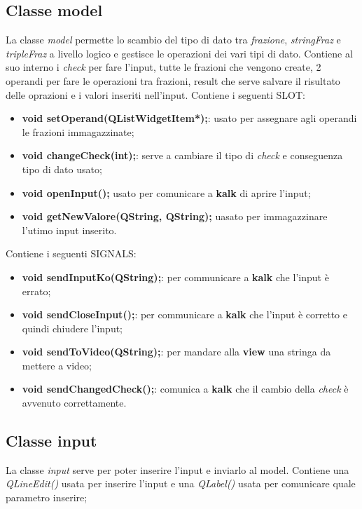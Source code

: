 \documentclass[a4paper,10pt]{article}
\begin{document}
    \subsection{Classe model}
        La classe \textit{model} permette lo scambio del tipo di dato tra \textit{frazione}, \textit{stringFraz} e \textit{tripleFraz} a livello logico e gestisce le operazioni dei vari tipi di dato. Contiene al suo interno i \textit{check} per fare l'input, tutte le frazioni che vengono create, 2 operandi per fare le operazioni tra frazioni, result che serve  salvare il risultato delle oprazioni e i valori inseriti nell'input.
        Contiene i seguenti SLOT:
        \begin{itemize}
        \item \textbf{void setOperand(QListWidgetItem*);}: usato per assegnare agli operandi le frazioni immagazzinate;
        \item \textbf{void changeCheck(int);}: serve a cambiare il tipo di \textit{check} e conseguenza tipo di dato usato;
        \item \textbf{void openInput();} usato per comunicare a \textbf{kalk} di aprire l'input;
        \item \textbf{void getNewValore(QString, QString);} uasato per immagazzinare l'utimo input inserito.
        \end{itemize}
        Contiene i seguenti SIGNALS:
        \begin{itemize}
            \item \textbf{void sendInputKo(QString);}: per communicare a \textbf{kalk} che l'input è errato;
            \item \textbf{void sendCloseInput();}: per communicare a \textbf{kalk} che l'input è corretto e quindi chiudere l'input;
            \item \textbf{void sendToVideo(QString);}: per mandare alla \textbf{view} una stringa da mettere a video;
            \item \textbf{void sendChangedCheck();}: comunica a \textbf{kalk} che il cambio della \textit{check} è avvenuto correttamente.
        \end{itemize}
    \subsection{Classe input}
        La classe \textit{input} serve per poter inserire l'input e inviarlo al model. Contiene una \textit{QLineEdit()} usata per inserire l'input e una \textit{QLabel()} usata per comunicare quale parametro inserire;
\end{document}
